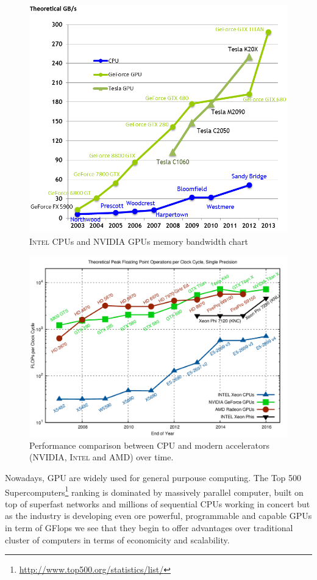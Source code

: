     \begin{figure}
    	\centering
    	\includegraphics[width=1.0\textwidth]{./images/parallel_programming/memory-bandwidth}
    	\caption{\textsc{Intel} CPUs and \textsc{NVIDIA} GPUs memory bandwidth
    		chart}\label{CPU-VS-GPU_MEMORY}
    \end{figure}
    \begin{figure}
    	\centering
    	\includegraphics[width=1.0\textwidth]{./images/parallel_programming/cpu-vs-gpu}
    	\caption{Performance comparison between CPU and modern accelerators (\textsc{NVIDIA}, \textsc{Intel} and \textsc{AMD}) over time.}\label{CPU-VS-GPU_GFLOP}
    \end{figure}
    Nowadays, GPU are widely used for general purpouse computing. The Top 500 Supercomputers\footnote{\url{http://www.top500.org/statistics/list/}} ranking is dominated by massively parallel computer, built on top of superfast networks and millions of sequential CPUs working in concert but as the industry is developing even ore powerful, programmable and capable GPUs in term of GFlops  we see that they begin to offer advantages over traditional cluster of computers in terms of economicity and scalability.
    
